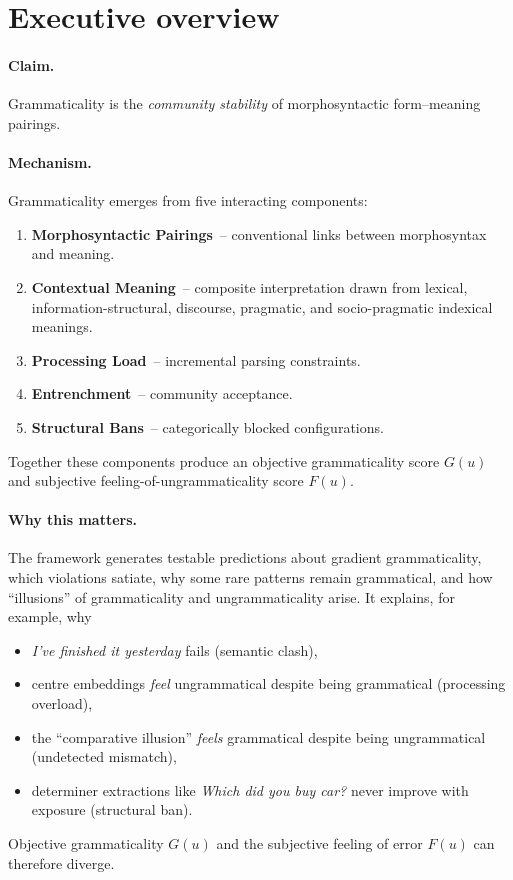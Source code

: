 \documentclass[12pt]{article}
\begin{document}
\section{Executive overview}

\paragraph*{Claim.}%
Grammaticality is the \emph{community stability} of morphosyntactic form–meaning pairings.

\paragraph*{Mechanism.}%
Grammaticality emerges from five interacting components:

\begin{enumerate}
    \item \textbf{Morphosyntactic Pairings}~-- conventional links between morphosyntax and meaning.
    \item \textbf{Contextual Meaning}~-- composite interpretation drawn from lexical, information-structural, discourse, pragmatic, and socio-pragmatic indexical meanings.
    \item \textbf{Processing Load}~-- incremental parsing constraints.
    \item \textbf{Entrenchment}~-- community acceptance.
    \item \textbf{Structural Bans}~-- categorically blocked configurations.
\end{enumerate}

Together these components produce an objective grammaticality score \(G(u)\) and subjective feeling-of-ungrammaticality score \(F(u)\).

\paragraph*{Why this matters.}
The framework generates testable predictions about gradient grammaticality, which violations satiate, why some rare patterns remain grammatical, and how \enquote{illusions} of grammaticality and ungrammaticality arise. It explains, for example, why
\begin{itemize}
    \item \textit{I've finished it yesterday} fails (semantic clash),  
    \item centre embeddings \emph{feel} ungrammatical despite being grammatical (processing overload),
    \item the \enquote{comparative illusion} \emph{feels} grammatical despite being ungrammatical (undetected mismatch),
    \item determiner extractions like \textit{Which did you buy car?} never improve with exposure (structural ban).
\end{itemize}
Objective grammaticality \(G(u)\) and the subjective feeling of error \(F(u)\) can therefore diverge.
\end{document}
